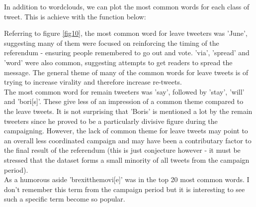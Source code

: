 \documentclass[10pt]{article}
\begin{document}
In addition to wordclouds, we can plot the most common words for each class of tweet. This is achieve with the function below:
\begin{Schunk}
\end{Schunk}
Referring to figure \ref{fig10}, the most common word for leave tweeters was 'June', suggesting many of them were focused on reinforcing the timing of the referendum - ensuring people remembered to go out and vote. 'via', 'spread' and 'word' were also common, suggesting attempts to get readers to spread the message. The general theme of many of the common words for leave tweets is of trying to increase virality and therefore increase re-tweets.\\
The most common word for remain tweeters was 'say', followed by 'stay', 'will' and 'bori[s]'. These give less of an impression of a common theme compared to the leave tweets. It is not surprising that 'Boris' is mentioned a lot by the remain tweeters since he proved to be a particularly divisive figure during the campaigning. However, the lack of common theme for leave tweets may point to an overall less coordinated campaign and may have been a contributary factor to the final result of the referendum (this is just conjecture however - it must be stressed that the dataset forms a small minority of all tweets from the campaign period).\\
As a humorous aside 'brexitthemovi[e]' was in the top 20 most common words. I don't remember this term from the campaign period but it is interesting to see such a specific term become so popular.
\end{document}
